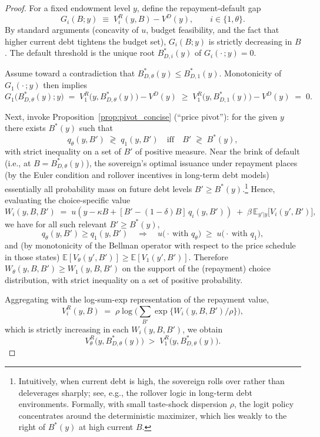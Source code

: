 \documentclass[12pt]{article}
\theoremstyle{plain}
\newcommand{\E}{\mathbb{E}}
\begin{document}
\begin{proof}
	For a fixed endowment level \(y\), define the repayment-default gap
	\[
		G_i(B;y)\;\equiv\;V^R_i(y,B)-V^D(y),\qquad i\in\{1,\theta\}.
	\]
	By standard arguments (concavity of \(u\), budget feasibility, and the fact
	that higher current debt tightens the budget set), \(G_i(B;y)\) is strictly
	decreasing in \(B\). The default threshold is the unique root \(B^*_{D,i}(y)\)
	of \(G_i(\cdot\,;y)=0\).

	Assume toward a contradiction that \(B^*_{D,\theta}(y)\le B^*_{D,1}(y)\).
	Monotonicity of \(G_1(\cdot\,;y)\) then implies
	\begin{equation}
		G_1\!\big(B^*_{D,\theta}(y);y\big)\;=\;V^R_1\!\big(y,B^*_{D,\theta}(y)\big)-V^D(y)
		\;\ge\;V^R_1\!\big(y,B^*_{D,1}(y)\big)-V^D(y)\;=\;0.
		\label{eq:baseline_nonnegative}
	\end{equation}

	Next, invoke Proposition~\ref{prop:pivot_concise} (“price pivot”): for the
	given \(y\) there exists \(B^*(y)\) such that
	\[
		q_\theta(y,B') \;\gtrless\; q_1(y,B')\quad\text{iff}\quad B' \;\gtrless\; B^*(y),
	\]
	with strict inequality on a set of \(B'\) of positive measure. Near the brink
	of default (i.e., at \(B=B^*_{D,\theta}(y)\)), the sovereign’s optimal issuance
	under repayment places (by the Euler condition and rollover incentives in
	long-term debt models) essentially all probability mass on future debt levels
	\(B'\ge B^*(y)\).\footnote{Intuitively, when current debt is high, the
		sovereign rolls over rather than deleverages sharply; see, e.g., the rollover
		logic in long-term debt environments. Formally, with small taste-shock
		dispersion \(\rho\), the logit policy concentrates around the deterministic
		maximizer, which lies weakly to the right of \(B^*(y)\) at high current \(B\).}
	Hence, evaluating the choice-specific value
	\[
		W_i(y,B,B') \;=\; u\!\left(y-\kappa B + [B'-(1-\delta)B]\,q_i(y,B')\right)
		\;+\; \beta\,\E_{y'|y}\big[V_i(y',B')\big],
	\]
	we have for all such relevant \(B'\ge B^*(y)\),
	\[
		q_\theta(y,B') \ge q_1(y,B') \quad\Longrightarrow\quad
		u\!\big(\cdot\ \text{with }q_\theta\big)\; \ge\; u\!\big(\cdot\ \text{with }q_1\big),
	\]
	and (by monotonicity of the Bellman operator with respect to the price schedule
	in those states) \(\E[V_\theta(y',B')]\ge \E[V_1(y',B')]\). Therefore
	\(W_\theta(y,B,B')\ge W_1(y,B,B')\) on the support of the (repayment) choice
	distribution, with strict inequality on a set of positive probability.

	Aggregating with the log-sum-exp representation of the repayment value,
	\[
		V^R_i(y,B) \;=\; \rho \log\!\Big(\sum_{B'} \exp\{W_i(y,B,B')/\rho\}\Big),
	\]
	which is strictly increasing in each \(W_i(y,B,B')\), we obtain
	\begin{equation}
		V^R_\theta\!\big(y,B^*_{D,\theta}(y)\big) \;>\; V^R_1\!\big(y,B^*_{D,\theta}(y)\big).
		\label{eq:VR_dominance}
	\end{equation}


\end{proof}
\end{document}
